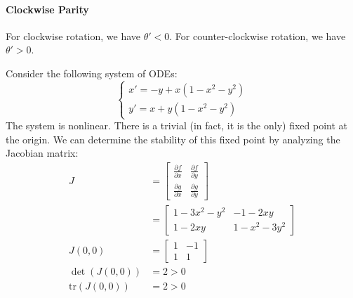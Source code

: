 \documentclass[11pt]{article}
\begin{document}
\paragraph{Clockwise Parity} For clockwise rotation, we have $\theta' < 0$. For counter-clockwise rotation, we have $\theta' > 0$.

\begin{example}
    Consider the following system of ODEs:
    $$\begin{cases}
        x' = -y + x(1 - x^2 - y^2) \\
        y' = x + y(1 - x^2 - y^2)
    \end{cases}
    $$
    The system is nonlinear. There is a trivial (in fact, it is the only) fixed point at the origin. We can determine the stability of this fixed point by analyzing the Jacobian matrix:
    \begin{align*}
        J &= \begin{bmatrix}
        \frac{\partial f}{\partial x} & \frac{\partial f}{\partial y} \\
        \frac{\partial g}{\partial x} & \frac{\partial g}{\partial y}
        \end{bmatrix} \\ 
        &= \begin{bmatrix}
        1 - 3x^2 - y^2 & -1 - 2xy \\
        1 - 2xy & 1 - x^2 - 3y^2
        \end{bmatrix} \\
        J(0, 0) &= \begin{bmatrix}
        1 & -1 \\
        1 & 1
        \end{bmatrix} \\
        \det(J(0, 0)) &= 2 > 0 \\
        \text{tr}(J(0, 0)) &= 2 > 0
    \end{align*}


\end{example}
\end{document}
